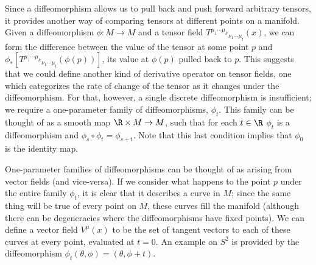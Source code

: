 \begin{figure}[h]
  \centerline{
  }
\end{figure}

Since a diffeomorphism allows us to pull back and push forward arbitrary
tensors, it provides another way of comparing tensors at different 
points on a manifold.  Given a diffeomorphism $\phi:M\rightarrow M$ and
a tensor field $T^{\mu_1 \cdots \mu_k}{}_{\nu_1 \cdots \mu_l}(x)$, we
can form the difference between the value of the tensor at some point
$p$ and $\phi_*[T^{\mu_1 \cdots \mu_k}{}_{\nu_1 \cdots \mu_l}(\phi(p))]$,
its value at $\phi(p)$ pulled back to $p$.
This suggests that we could define another kind of derivative operator
on tensor fields, one which categorizes the rate of change of the
tensor as it changes under the diffeomorphism.  For that, however, a
single discrete diffeomorphism is insufficient; we require a one-parameter
family of diffeomorphisms, $\phi_t$.  This family can be thought of as
a smooth map $\R\times M\rightarrow M$, such that for each $t\in\R$
$\phi_t$ is a diffeomorphism and $\phi_s\circ\phi_t=\phi_{s+t}$.  Note
that this last condition implies that $\phi_0$ is the identity map.

One-parameter families of diffeomorphisms can be thought of as arising
from vector fields (and vice-versa).  If we consider what happens to
the point $p$ under the entire family $\phi_t$, it is clear that it
describes a curve in $M$; since the same thing will be true of every
point on $M$, these curves fill the manifold (although there can be
degeneracies where the diffeomorphisms have fixed points).  We can define
a vector field $V^\mu(x)$ to be the set of tangent vectors to each of
these curves at every point, evaluated at $t=0$.  An example on $S^2$
is provided by the diffeomorphism $\phi_t(\theta,\phi)=(\theta,\phi+t)$.

\begin{figure}
  \centerline{
  }
\end{figure}

